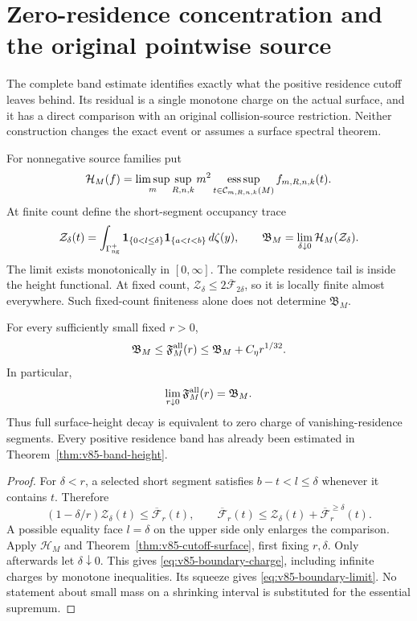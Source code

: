 \section{Zero-residence concentration and the original pointwise source}
\label{sec:v85-zero-residence}
The complete band estimate identifies exactly what the positive
residence cutoff leaves behind. Its residual is a single monotone
charge on the actual surface, and it has a direct comparison with
an original collision-source restriction. Neither construction changes
the exact event or assumes a surface spectral theorem.

For nonnegative source families put
\[
 \mathcal H_M(f)=\limsup_m\sup_{R,n,k}m^2
       \operatorname*{ess\,sup}_{t\in\mathcal C_{m,R,n,k}(M)} f_{m,R,n,k}(t).
\]
At finite count define the short-segment occupancy trace
\begin{equation}\label{eq:v85-zero-residence-source}
 \mathcal Z_\delta(t)=\int_{\Gamma_{\rm ng}^+}
           \one_{\{0<l\le\delta\}}\one_{\{a<t<b\}}\,d\zeta(y),
 \qquad
 \mathfrak B_M=\lim_{\delta\downarrow0}\mathcal H_M(\mathcal Z_\delta).
\end{equation}
The limit exists monotonically in $[0,\infty]$. The complete residence
tail is inside the height functional. At fixed count,
$\mathcal Z_\delta\le2\overline{\mathcal F}_{2\delta}$, so it
is locally finite almost everywhere. Such fixed-count finiteness
alone does not determine $\mathfrak B_M$.

\begin{theorem}
\label{thm:v85-boundary-charge}
For every sufficiently small fixed $r>0$,
\begin{equation}\label{eq:v85-boundary-charge}
 \mathfrak B_M\le\mathfrak F_M^{\rm all}(r)
             \le\mathfrak B_M+C_\eta r^{1/32}.
\end{equation}
In particular,
\begin{equation}\label{eq:v85-boundary-limit}
       \lim_{r\downarrow0}\mathfrak F_M^{\rm all}(r)=\mathfrak B_M.
\end{equation}
Thus full surface-height decay is equivalent to zero charge of
vanishing-residence segments. Every positive residence band has
already been estimated in Theorem~\ref{thm:v85-band-height}.
\end{theorem}
\begin{proof}
For $\delta<r$, a selected short segment satisfies $b-t<l\le\delta$
whenever it contains $t$. Therefore
\[
 (1-\delta/r)\mathcal Z_\delta(t)
       \le\overline{\mathcal F}_r(t),\qquad
 \overline{\mathcal F}_r(t)
       \le\mathcal Z_\delta(t)+\overline{\mathcal F}_r^{\ge\delta}(t).
\]
A possible equality face $l=\delta$ on the upper side only enlarges
the comparison. Apply $\mathcal H_M$ and
Theorem~\ref{thm:v85-cutoff-surface}, first fixing $r,\delta$.
Only afterwards let $\delta\downarrow0$. This gives
\eqref{eq:v85-boundary-charge}, including infinite charges by monotone
inequalities. Its squeeze gives \eqref{eq:v85-boundary-limit}.
No statement about small mass on a shrinking interval is substituted
for the essential supremum.
\end{proof}

